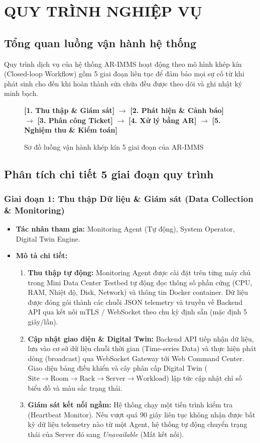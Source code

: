 \chapter{QUY TRÌNH NGHIỆP VỤ}

\section{Tổng quan luồng vận hành hệ thống}
Quy trình dịch vụ của hệ thống AR-IMMS hoạt động theo mô hình khép kín (Closed-loop Workflow) gồm 5 giai đoạn liên tục để đảm bảo mọi sự cố từ khi phát sinh cho đến khi hoàn thành sửa chữa đều được theo dõi và ghi nhật ký minh bạch.

\begin{figure}[H]
\centering
\textbf{[1. Thu thập \& Giám sát]} $\longrightarrow$ \textbf{[2. Phát hiện \& Cảnh báo]} $\longrightarrow$ \textbf{[3. Phân công Ticket]} $\longrightarrow$ \textbf{[4. Xử lý bằng AR]} $\longrightarrow$ \textbf{[5. Nghiệm thu \& Kiểm toán]}
\caption{Sơ đồ luồng vận hành khép kín 5 giai đoạn của AR-IMMS}
\end{figure}

\section{Phân tích chi tiết 5 giai đoạn quy trình}

\subsection{Giai đoạn 1: Thu thập Dữ liệu \& Giám sát (Data Collection \& Monitoring)}
\begin{itemize}
    \item \textbf{Tác nhân tham gia:} Monitoring Agent (Tự động), System Operator, Digital Twin Engine.
    \item \textbf{Mô tả chi tiết:}
    \begin{enumerate}
        \item \textbf{Thu thập tự động:} Monitoring Agent được cài đặt trên từng máy chủ trong Mini Data Center Testbed tự động đọc thông số phần cứng (CPU, RAM, Nhiệt độ, Disk, Network) và thông tin Docker container. Dữ liệu được đóng gói thành các chuỗi JSON telemetry và truyền về Backend API qua kết nối mTLS / WebSocket theo chu kỳ định sẵn (mặc định 5 giây/lần).
        \item \textbf{Cập nhật giao diện \& Digital Twin:} Backend API tiếp nhận dữ liệu, lưu vào cơ sở dữ liệu chuỗi thời gian (Time-series Data) và thực hiện phát dòng (broadcast) qua WebSocket Gateway tới Web Command Center. Giao diện bảng điều khiển và cây phân cấp Digital Twin ($\text{Site} \rightarrow \text{Room} \rightarrow \text{Rack} \rightarrow \text{Server} \rightarrow \text{Workload}$) lập tức cập nhật chỉ số biểu đồ và màu sắc trạng thái.
        \item \textbf{Giám sát kết nối ngầm:} Hệ thống chạy một tiến trình kiểm tra (Heartbeat Monitor). Nếu vượt quá 90 giây liên tục không nhận được bất kỳ dữ liệu telemetry nào từ một Agent, hệ thống tự động chuyển trạng thái của Server đó sang \textit{Unavailable} (Mất kết nối).
    \end{enumerate}
\end{itemize}


